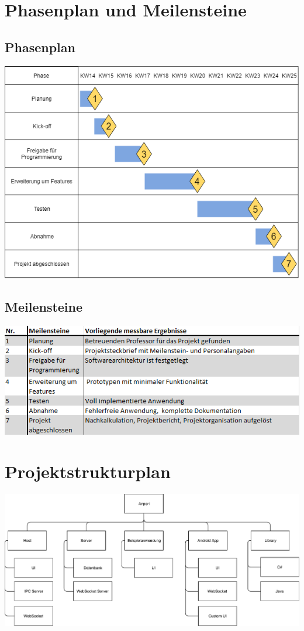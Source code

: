 \documentclass{scrartcl}
\begin{document}
\section{Phasenplan und Meilensteine}
\subsection{Phasenplan}
\includegraphics[scale=0.75]{Phasen.png}
\subsection{Meilensteine}
\includegraphics[scale=0.75]{Meilensteine.png}
\section{Projektstrukturplan}
\includegraphics[scale=0.75]{PSP.pdf}
\end{document}
